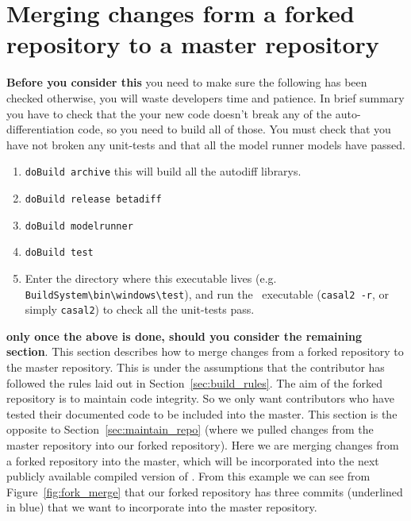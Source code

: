 \section{Merging changes form a forked repository to a master repository\label{sec:pull_requests}}

\textbf{Before you consider this} you need to make sure the following has been checked otherwise, you will waste developers time and patience. In brief summary you have to check that the your new code doesn't break any of the auto-differentiation code, so you need to build all of those. You must check that you have not broken any unit-tests and that all the model runner models have passed.

\begin{enumerate}
\item \texttt{doBuild archive} this will build all the autodiff librarys.
\item \texttt{doBuild release betadiff}
\item \texttt{doBuild modelrunner}
\item \texttt{doBuild test} 
\item Enter the directory where this executable lives (e.g. \texttt{BuildSystem\textbackslash bin\textbackslash windows\textbackslash test}), and run the \CNAME\ executable (\texttt{casal2 -r}, or simply \texttt{casal2}) to check all the unit-tests pass.
			
\end{enumerate}


\textbf{only once the above is done, should you consider the remaining section}. This section describes how to merge changes from a forked repository to the master repository. This is under the assumptions that the contributor has followed the rules laid out in Section~\ref{sec:build_rules}. The aim of the forked repository is to maintain code integrity. So we only want contributors who have tested their documented code to be included into the master. This section is the opposite to Section~\ref{sec:maintain_repo} (where we pulled changes from the master repository into our forked repository). Here we are merging changes from a forked repository into the master, which will be incorporated into the next publicly available compiled version of \CNAME. From this example we can see from Figure~\ref{fig:fork_merge} that our forked repository has three commits (underlined in blue) that we want to incorporate into the master repository.

